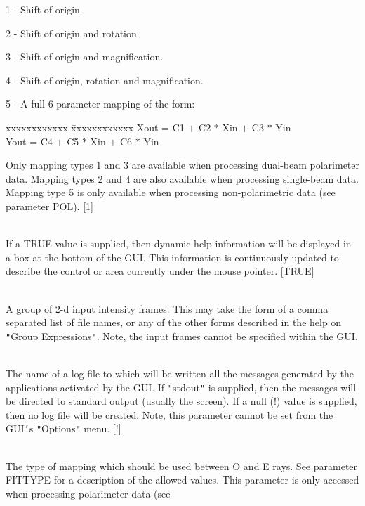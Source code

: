 \documentclass[twoside,11pt]{article}
\renewcommand{\_}{\texttt{\symbol{95}}}
\newcommand{\sstsubsection}[1]{ \item[{#1}] \mbox{} \\}
\newcommand{\sstsubsection}[1]{\item[{#1}]}
\begin{document}
{{{         1 - Shift of origin.

         2 - Shift of origin and rotation.

         3 - Shift of origin and magnification.

         4 - Shift of origin, rotation and magnification.

         5 - A full 6 parameter mapping of the form:

\begin{tabbing}
 xxxxxxxxxxxx \= xxxxxxxxxxxx \kill
              \>  X\_out = C1  $+$  C2 $*$ X\_in  $+$  C3 $*$ Y\_in \\
              \>  Y\_out = C4  $+$  C5 $*$ X\_in  $+$  C6 $*$ Y\_in
\end{tabbing}

         Only mapping types 1 and 3 are available when processing
         dual-beam polarimeter data. Mapping types 2 and 4 are also
         available when processing single-beam data. Mapping type 5 
         is only available when processing non-polarimetric data (see 
         parameter POL). [1]
      }
      \sstsubsection{
         HELPAREA = \_LOGICAL (Update)
      }{
         If a TRUE value is supplied, then dynamic help information will be
         displayed in a box at the bottom of the GUI. This information
         is continuously updated to describe the control or area currently
         under the mouse pointer. [TRUE]
      }
      \sstsubsection{
         IN = NDF (Read)
      }{
         A group of 2-d input intensity frames. This may take the form of a
         comma separated list of file names, or any of the other forms
         described in the help on {\tt "}Group Expressions{\tt "}. Note, the input frames
         cannot be specified within the GUI.
      }
      \sstsubsection{
         LOGFILE = LITERAL (Read)
      }{
         The name of a log file to which will be written all the messages
         generated by the applications activated by the GUI. If {\tt "}stdout{\tt "}
         is supplied, then the messages will be directed to standard
         output (usually the screen). If a null (!) value is supplied, then
         no log file will be created. Note, this parameter cannot be set
         from the GUI{\tt '}s {\tt "}Options{\tt "} menu. [!]
      }
      \sstsubsection{
         OEFITTYPE = \_INTEGER (Update)
      }{
         The type of mapping which should be used between O and E rays. See
         parameter FITTYPE for a description of the allowed values. This
         parameter is only accessed when processing polarimeter data (see
}}}
\end{document}
